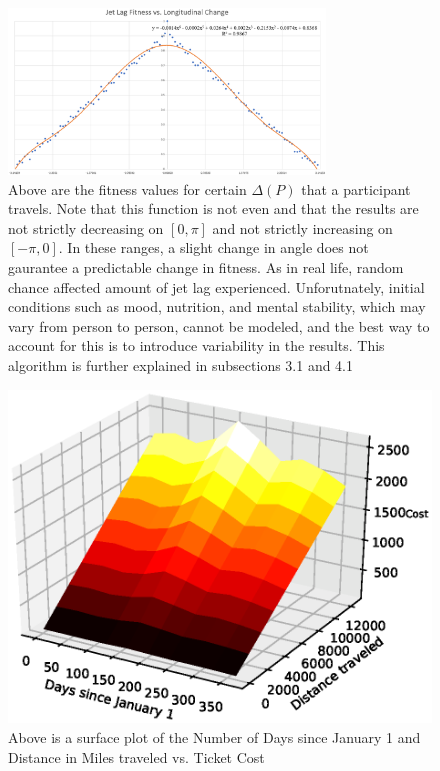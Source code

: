 \begin{figure}
	\centerline{\includegraphics[width=0.75\textwidth]{kuramotofitnessgraph.eps}}
	\caption{Above are the fitness values for certain $\Delta(P)$ that a participant travels. Note that this function is not even and that the results are not strictly decreasing on $[0, \pi]$ and not strictly increasing on $[-\pi, 0]$. In these ranges, a slight change in angle does not gaurantee a predictable change in fitness. As in real life, random chance affected amount of jet lag experienced. Unforutnately, initial conditions such as mood, nutrition, and mental stability, which may vary from person to person, cannot be modeled, and the best way to account for this is to introduce variability in the results. This algorithm is further explained in subsections 3.1 and 4.1}
\end{figure}	
\begin{figure}[t!]
	\includegraphics[width=\textwidth]{destination_path.eps}
	\caption{Above is a surface plot of the Number of Days since January 1 and Distance in Miles traveled vs. Ticket Cost}
\end{figure}

\begin{figure}
\end{figure}
